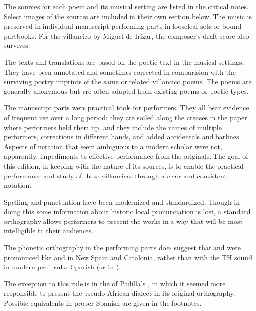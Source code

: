 
The sources for each poem and its musical setting are listed in the 
critical notes.
Select images of the sources are included in their own section below.
The music is preserved in individual manuscript performing parts in looseleaf 
sets or bound partbooks.
For the villancico by Miguel de Irízar, the composer's draft score also 
survives.

The texts and translations are based on the poetic text in the musical settings.
They have been annotated and sometimes corrected in comparision with the 
surviving poetry imprints of the same or related villancico poems.
The poems are generally anonymous but are often adapted from existing poems or 
poetic types.

The manuscript parts were practical tools for performers.
They all bear evidence of frequent use over a long period: they are soiled 
along the creases in the paper where performers held them up, and they include 
the names of multiple performers, corrections in different hands, and added 
accidentals and barlines.
Aspects of notation that seem ambiguous to a modern scholar were not, 
apparently, impediments to effective performance from the originals.
The goal of this edition, in keeping with the nature of its sources, is to 
enable the practical performance and study of these villancicos through a clear
and consistent notation.


Spelling and punctuation have been modernized and standardized.
Though in doing this some information about historic local pronunciation is
lost, a standard orthography allows performers to present the works in a way
that will be most intelligible to their audiences.%
\begin{Footnote}
    The phonetic orthography in the performing parts does suggest that
     and  were pronounced like  and
     in New Spain and Catalonia, rather than with the TH sound in
    modern peninsular Spanish (as in ).
\end{Footnote}
The exception to this rule is in the  of Padilla's , in which it seemed more responsible to present the 
pseudo-African dialect in its original orthography.
Possible equivalents in proper Spanish are given in the footnotes.

